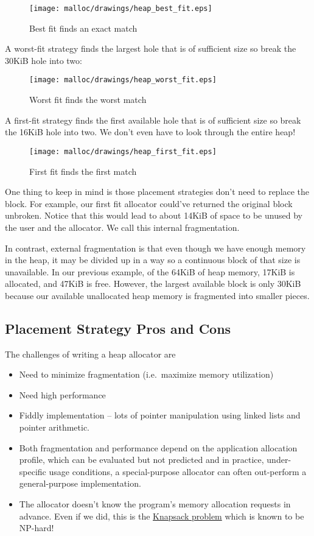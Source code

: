\begin{figure}[H]
\centering
\texttt{[image: malloc/drawings/heap\_best\_fit.eps]}
\caption{Best fit finds an exact match}
\end{figure}

A worst-fit strategy finds the largest hole that is of sufficient size so break the 30KiB hole into two:

\begin{figure}[H]
\centering
\texttt{[image: malloc/drawings/heap\_worst\_fit.eps]}
\caption{Worst fit finds the worst match}
\end{figure}


A first-fit strategy finds the first available hole that is of sufficient size so break the 16KiB hole into two.
We don't even have to look through the entire heap!

\begin{figure}[H]
\centering
\texttt{[image: malloc/drawings/heap\_first\_fit.eps]}
\caption{First fit finds the first match}
\end{figure}

One thing to keep in mind is those placement strategies don't need to replace the block.
For example, our first fit allocator could've returned the original block unbroken.
Notice that this would lead to about 14KiB of space to be unused by the user and the allocator.
We call this internal fragmentation.

In contrast, external fragmentation is that even though we have enough memory in the heap, it may be divided up in a way so a continuous block of that size is unavailable.
In our previous example, of the 64KiB of heap memory, 17KiB is allocated, and 47KiB is free.
However, the largest available block is only 30KiB because our available unallocated heap memory is fragmented into smaller pieces.

\subsection{Placement Strategy Pros and Cons}

The challenges of writing a heap allocator are
\begin{itemize}
\item Need to minimize fragmentation (i.e.~maximize memory utilization)
\item Need high performance
\item Fiddly implementation -- lots of pointer manipulation using linked lists and pointer arithmetic.
\item Both fragmentation and performance depend on the application allocation profile, which can be evaluated but not predicted and in practice, under-specific usage conditions, a special-purpose allocator can often out-perform a general-purpose implementation.
\item The allocator doesn't know the program's memory allocation requests in advance. Even if we did, this is the \href{http://en.wikipedia.org/wiki/Knapsack_problem}{Knapsack problem} which is known to be NP-hard!
\end{itemize}

